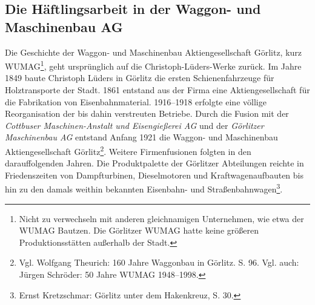 \documentclass[a4paper,12pt,ngerman,
]{nisebook}
\begin{document}
\subsection{Die Häftlingsarbeit in der Waggon- und Maschinenbau AG}

Die Geschichte der Waggon- und Maschinenbau Aktiengesellschaft Görlitz, kurz WUMAG\footnote{Nicht zu verwechseln mit anderen gleichnamigen Unternehmen, wie etwa der WUMAG Bautzen. Die Görlitzer WUMAG hatte keine größeren Produktionsstätten außerhalb der Stadt.}, geht ursprünglich auf die Christoph-Lüders-Werke zurück. Im Jahre 1849 baute Christoph Lüders in Görlitz die ersten Schienenfahrzeuge für Holztransporte der Stadt. 1861 entstand aus der Firma eine Aktiengesellschaft für die Fabrikation von Eisenbahnmaterial. 1916--1918 erfolgte eine völlige Reorganisation der bis dahin verstreuten Betriebe. Durch die Fusion mit der \emph{Cottbuser Maschinen-Anstalt und Eisengießerei AG} und der \emph{Görlitzer Maschinenbau AG} entstand Anfang 1921 die Waggon- und Maschinenbau Aktiengesellschaft Görlitz\footnote{Vgl. Wolfgang Theurich: 160 Jahre Waggonbau in Görlitz. S. 96. Vgl. auch: Jürgen Schröder: 50 Jahre WUMAG 1948--1998.}. Weitere Firmenfusionen folgten in den darauffolgenden Jahren.
 Die Produktpalette der Görlitzer Abteilungen reichte in Friedenszeiten von Dampfturbinen, Dieselmotoren und Kraftwagenaufbauten bis hin zu den damals weithin bekannten Eisenbahn- und Straßenbahnwagen\footnote{Ernst Kretzschmar: Görlitz unter dem Hakenkreuz, S. 30.}. \newline
\end{document}
